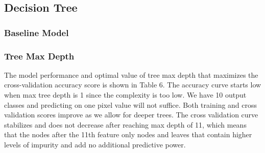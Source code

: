 \documentclass{article}
\begin{document}
\subsection{Decision Tree}
\subsubsection*{Baseline Model}

\subsubsection*{Tree Max Depth}
The model performance and optimal value of tree max depth that maximizes the cross-validation accuracy score is shown in Table 6. The accuracy curve starts low when max tree depth is 1 since the complexity is too low. We have 10 output classes and predicting on one pixel value will not suffice. Both training and cross validation scores improve as we allow for deeper trees. The cross validation curve stabilizes and does not decrease after reaching max depth of 11, which means that the nodes after the 11th feature only nodes and leaves that contain higher levels of impurity and add no additional predictive power. 
\end{document}
